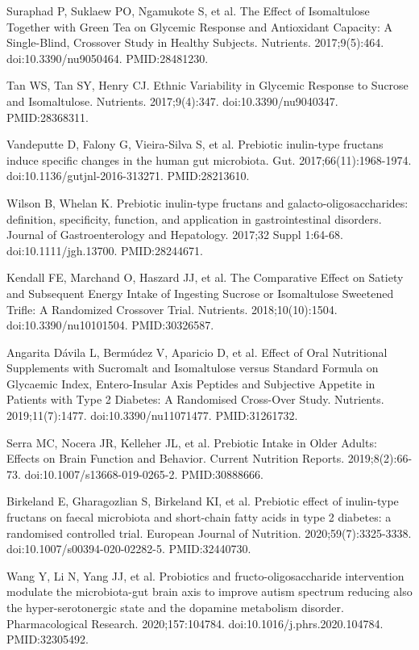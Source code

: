 \documentclass[12pt,oneside]{book}
\newcommand{\reff}[2]{\par\hangindent=7mm\hangafter=1\noindent[#1]\hspace{2mm}#2\par}
\begin{document}
\reff{8}{Suraphad P, Suklaew PO, Ngamukote S, et al. The Effect of Isomaltulose Together with Green Tea on Glycemic Response and Antioxidant Capacity: A Single-Blind, Crossover Study in Healthy Subjects. Nutrients. 2017;9(5):464. doi:10.3390/nu9050464. PMID:28481230.}

\reff{9}{Tan WS, Tan SY, Henry CJ. Ethnic Variability in Glycemic Response to Sucrose and Isomaltulose. Nutrients. 2017;9(4):347. doi:10.3390/nu9040347. PMID:28368311.}

\reff{10}{Vandeputte D, Falony G, Vieira-Silva S, et al. Prebiotic inulin-type fructans induce specific changes in the human gut microbiota. Gut. 2017;66(11):1968-1974. doi:10.1136/gutjnl-2016-313271. PMID:28213610.}

\reff{11}{Wilson B, Whelan K. Prebiotic inulin-type fructans and galacto-oligosaccharides: definition, specificity, function, and application in gastrointestinal disorders. Journal of Gastroenterology and Hepatology. 2017;32 Suppl 1:64-68. doi:10.1111/jgh.13700. PMID:28244671.}

\reff{12}{Kendall FE, Marchand O, Haszard JJ, et al. The Comparative Effect on Satiety and Subsequent Energy Intake of Ingesting Sucrose or Isomaltulose Sweetened Trifle: A Randomized Crossover Trial. Nutrients. 2018;10(10):1504. doi:10.3390/nu10101504. PMID:30326587.}

\reff{13}{Angarita Dávila L, Bermúdez V, Aparicio D, et al. Effect of Oral Nutritional Supplements with Sucromalt and Isomaltulose versus Standard Formula on Glycaemic Index, Entero-Insular Axis Peptides and Subjective Appetite in Patients with Type 2 Diabetes: A Randomised Cross-Over Study. Nutrients. 2019;11(7):1477. doi:10.3390/nu11071477. PMID:31261732.}

\reff{14}{Serra MC, Nocera JR, Kelleher JL, et al. Prebiotic Intake in Older Adults: Effects on Brain Function and Behavior. Current Nutrition Reports. 2019;8(2):66-73. doi:10.1007/s13668-019-0265-2. PMID:30888666.}

\reff{15}{Birkeland E, Gharagozlian S, Birkeland KI, et al. Prebiotic effect of inulin-type fructans on faecal microbiota and short-chain fatty acids in type 2 diabetes: a randomised controlled trial. European Journal of Nutrition. 2020;59(7):3325-3338. doi:10.1007/s00394-020-02282-5. PMID:32440730.}

\reff{16}{Wang Y, Li N, Yang JJ, et al. Probiotics and fructo-oligosaccharide intervention modulate the microbiota-gut brain axis to improve autism spectrum reducing also the hyper-serotonergic state and the dopamine metabolism disorder. Pharmacological Research. 2020;157:104784. doi:10.1016/j.phrs.2020.104784. PMID:32305492.}
\end{document}
